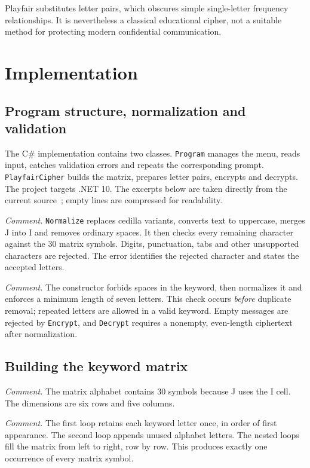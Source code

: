 \documentclass{tum_report}
\newcommand{\codepart}[2]{{\setstretch{1}}}
\begin{document}
Playfair substitutes letter pairs, which obscures simple single-letter
frequency relationships. It is nevertheless a classical educational cipher,
not a suitable method for protecting modern confidential communication.

\clearpage
\chapter{Implementation}
\section{Program structure, normalization and validation}
The C\# implementation contains two classes. \texttt{Program} manages the
menu, reads input, catches validation errors and repeats the corresponding
prompt. \texttt{PlayfairCipher} builds the matrix, prepares letter pairs,
encrypts and decrypts. The project targets .NET 10. The excerpts below
are taken directly from the current source~\cite{ref:source}; empty lines
are compressed for readability.

\codepart{100}{125}
\noindent\textit{Comment.} \texttt{Normalize} replaces cedilla variants,
converts text to uppercase, merges J into I and removes ordinary spaces.
It then checks every remaining character against the 30 matrix symbols.
Digits, punctuation, tabs and other unsupported characters are rejected.
The error identifies the rejected character and states the accepted letters.

\codepart{15}{25}
\noindent\textit{Comment.} The constructor forbids spaces in the keyword,
then normalizes it and enforces a minimum length of seven letters. This
check occurs \emph{before} duplicate removal; repeated letters are allowed
in a valid keyword. Empty messages are rejected by \texttt{Encrypt}, and
\texttt{Decrypt} requires a nonempty, even-length ciphertext after normalization.

\clearpage
\section{Building the keyword matrix}
\codepart{5}{9}
\noindent\textit{Comment.} The matrix alphabet contains 30 symbols because
J uses the I cell. The dimensions are six rows and five columns.

\codepart{127}{159}
\noindent\textit{Comment.} The first loop retains each keyword letter once,
in order of first appearance. The second loop appends unused alphabet
letters. The nested loops fill the matrix from left to right, row by row.
This produces exactly one occurrence of every matrix symbol.
\end{document}
